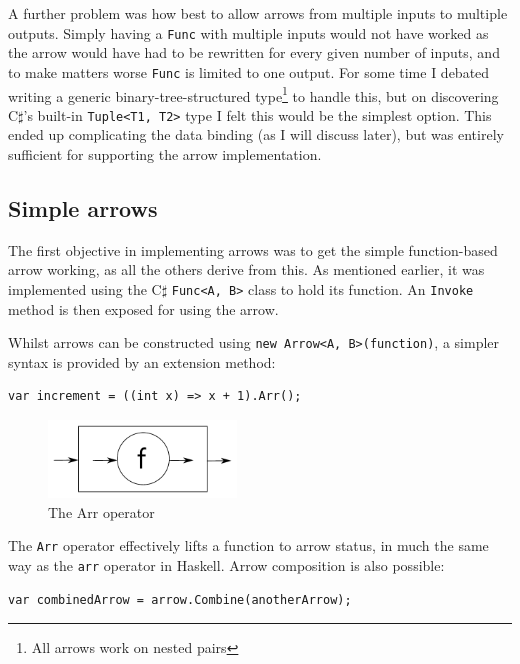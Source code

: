 \documentclass[12pt,twoside,notitlepage]{report}
\begin{document}
A further problem was how best to allow arrows from multiple inputs to multiple outputs. Simply having a \texttt{Func} with multiple inputs would not have worked as the arrow would have had to be rewritten for every given number of inputs, and to make matters worse \texttt{Func} is limited to one output. For some time I debated writing a generic binary-tree-structured type\footnote{All arrows work on nested pairs} to handle this, but on discovering C$\sharp$'s built-in \texttt{Tuple<T1, T2>} type I felt this would be the simplest option. This ended up complicating the data binding (as I will discuss later), but was entirely sufficient for supporting the arrow implementation.


\subsection{Simple arrows} \label{sec:simple_arrow_implementation}

The first objective in implementing arrows was to get the simple function-based arrow working, as all the others derive from this. As mentioned earlier, it was implemented using the C$\sharp$ \texttt{Func<A, B>} class to hold its function. An \texttt{Invoke} method is then exposed for using the arrow.

Whilst arrows can be constructed using \texttt{new Arrow<A, B>(function)}, a simpler syntax is provided by an extension method:

\begin{lstlisting}[language={[Sharp]C}]
var increment = ((int x) => x + 1).Arr();
\end{lstlisting}

\begin{figure}[!ht]
  \centering
  \includegraphics[width=50mm]{fig/ArrOperator.pdf}
  \caption{The Arr operator}
  \label{fig:arr_operator}
\end{figure}

The \texttt{Arr} operator effectively lifts a function to arrow status, in much the same way as the \texttt{arr} operator in Haskell. Arrow composition is also possible:

\begin{lstlisting}[language={[Sharp]C}]
var combinedArrow = arrow.Combine(anotherArrow);
\end{lstlisting}
\end{document}
